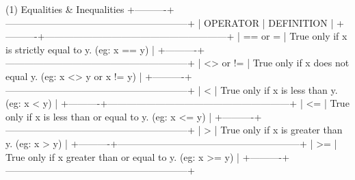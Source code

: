 (1) Equalities \& Inequalities
+----------+---------------------------------------------------------+
| OPERATOR | DEFINITION                                              |
+----------+---------------------------------------------------------+
| == or =  | True only if x is strictly equal to y. (eg: x == y)     |
+----------+---------------------------------------------------------+
| <> or != | True only if x does not equal y. (eg: x <> y or x != y) |
+----------+---------------------------------------------------------+
|  <       | True only if x is less than y. (eg: x < y)              |
+----------+---------------------------------------------------------+
|  <=      | True only if x is less than or equal to y. (eg: x <= y) |
+----------+---------------------------------------------------------+
|  >       | True only if x is greater than y. (eg: x > y)           |
+----------+---------------------------------------------------------+
|  >=      | True only if x greater than or equal to y. (eg: x >= y) |
+----------+---------------------------------------------------------+


